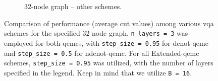 \begin{figure}[hb!]
\begin{subfigure}[b]{0.495\textwidth}
        \caption{$32$-node graph – other schemes.}
        \label{fig:32-node_Graph}
    \end{subfigure}
    \caption{Comparison of performance (average cut values) among various \acrshort{vqa} schemes for the specified $32$-node graph. \texttt{n\_layers = 3} was employed for both \acrshort{qemc}\textcolor{gray}{s}, with \texttt{step\_size = 0.95} for \acrshort{dcnot}-\acrshort{qemc} and \texttt{step\_size = 0.5} for \acrshort{ndcnot}-\acrshort{qemc}. For all Extended-\acrshort{qemc} schemes, \texttt{step\_size = 0.95} was utilized, with the number of layers specified in the legend. Keep in mind that we utilize \texttt{B = 16}.}
    \label{fig:32-node_Graph(2-Subfigures)}
\end{figure}

\clearpage

